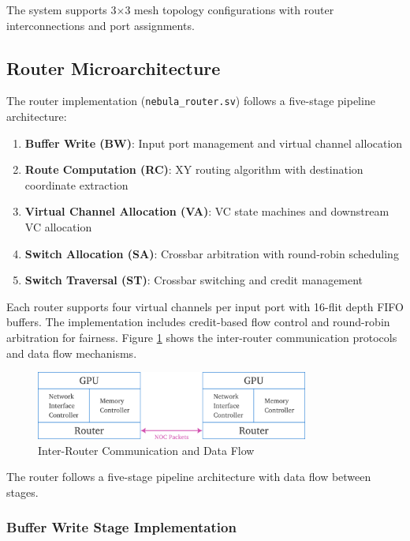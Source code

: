 \documentclass[12pt,letterpaper]{article}
\begin{document}
The system supports 3×3 mesh topology configurations with router interconnections and port assignments.

\subsection{Router Microarchitecture}

The router implementation (\texttt{nebula\_router.sv}) follows a five-stage pipeline architecture:

\begin{enumerate}
    \item \textbf{Buffer Write (BW)}: Input port management and virtual channel allocation
    \item \textbf{Route Computation (RC)}: XY routing algorithm with destination coordinate extraction
    \item \textbf{Virtual Channel Allocation (VA)}: VC state machines and downstream VC allocation
    \item \textbf{Switch Allocation (SA)}: Crossbar arbitration with round-robin scheduling
    \item \textbf{Switch Traversal (ST)}: Crossbar switching and credit management
\end{enumerate}

Each router supports four virtual channels per input port with 16-flit depth FIFO buffers. The implementation includes credit-based flow control and round-robin arbitration for fairness. Figure \ref{fig:inter-router-comms} shows the inter-router communication protocols and data flow mechanisms.

\begin{figure}[H]
    \centering
    \includegraphics[width=0.8\textwidth]{images/inter-router-comms.png}
    \caption{Inter-Router Communication and Data Flow}
    \label{fig:inter-router-comms}
\end{figure}

The router follows a five-stage pipeline architecture with data flow between stages.

\subsubsection{Buffer Write Stage Implementation}
\end{document}
